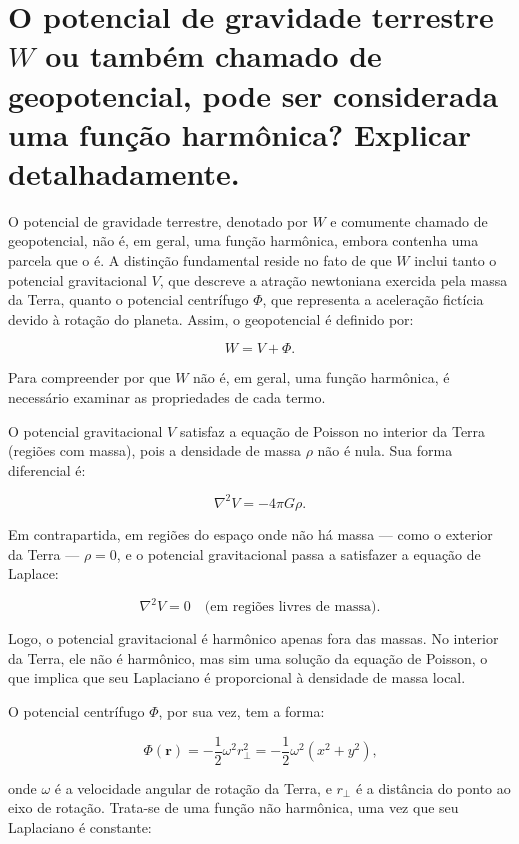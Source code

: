 
\section{O potencial de gravidade terrestre $W$ ou também chamado de geopotencial, pode ser considerada uma função harmônica? Explicar detalhadamente.}

O potencial de gravidade terrestre, denotado por \( W \) e comumente chamado de geopotencial, não é, em geral, uma função harmônica, embora contenha uma parcela que o é. A distinção fundamental reside no fato de que \( W \) inclui tanto o potencial gravitacional \( V \), que descreve a atração newtoniana exercida pela massa da Terra, quanto o potencial centrífugo \( \Phi \), que representa a aceleração fictícia devido à rotação do planeta. Assim, o geopotencial é definido por:

\[
W = V + \Phi \text{.}
\]

Para compreender por que \( W \) não é, em geral, uma função harmônica, é necessário examinar as propriedades de cada termo.

O potencial gravitacional \( V \) satisfaz a equação de Poisson no interior da Terra (regiões com massa), pois a densidade de massa \( \rho \) não é nula. Sua forma diferencial é:

\[
\nabla^2 V = -4\pi G \rho \text{.}
\]

Em contrapartida, em regiões do espaço onde não há massa — como o exterior da Terra — \( \rho = 0 \), e o potencial gravitacional passa a satisfazer a equação de Laplace:

\[
\nabla^2 V = 0 \quad \text{(em regiões livres de massa).}
\]

Logo, o potencial gravitacional é harmônico apenas fora das massas. No interior da Terra, ele não é harmônico, mas sim uma solução da equação de Poisson, o que implica que seu Laplaciano é proporcional à densidade de massa local.

O potencial centrífugo \( \Phi \), por sua vez, tem a forma:

\[
\Phi(\mathbf{r}) = -\frac{1}{2} \omega^2 r_\perp^2 = -\frac{1}{2} \omega^2 (x^2 + y^2) \text{,}
\]

onde \( \omega \) é a velocidade angular de rotação da Terra, e \( r_\perp \) é a distância do ponto ao eixo de rotação. Trata-se de uma função não harmônica, uma vez que seu Laplaciano é constante:

